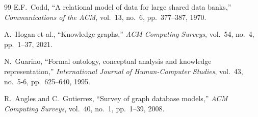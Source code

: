 \documentclass[11pt,a4paper]{article}
\begin{document}
\begin{thebibliography}{99}
 E.F.~Codd, ``A relational model of data for large shared data
  banks,'' \emph{Communications of the ACM}, vol.~13, no.~6, pp.~377--387, 1970.

 A.~Hogan et al., ``Knowledge graphs,''
  \emph{ACM Computing Surveys}, vol.~54, no.~4, pp.~1--37, 2021.

 N.~Guarino, ``Formal ontology, conceptual analysis and
  knowledge representation,'' \emph{International Journal of Human-Computer
  Studies}, vol.~43, no.~5-6, pp.~625--640, 1995.

 R.~Angles and C.~Gutierrez, ``Survey of graph database
  models,'' \emph{ACM Computing Surveys}, vol.~40, no.~1, pp.~1--39, 2008.

\end{thebibliography}
\end{document}
